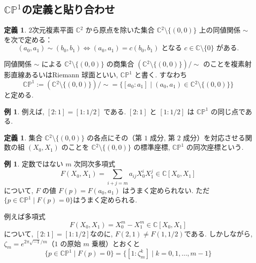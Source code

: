 \documentclass[dvipdfmx,a4paper,11pt]{article} %
\newcommand{\C}{\mathbb{C}}
\theoremstyle{definition}
\numberwithin{equation}{section}
\newtheorem{dfn}[thm]{定義}
\newtheorem{exa}[thm]{例}
\begin{document}
\subsection{$\C\mathbb P^1$の定義と貼り合わせ}\label{O-S002}


\begin{dfn}\label{O-M001}
$2$次元複素平面 $\C{}^2$ から原点を除いた集合 $\C{}^2\setminus \{(0,0)\}$ 上の同値関係 $\sim$ を次で定める：
\[
(a_0,a_1)\sim (b_0,b_1)
\Longleftrightarrow
(a_0,a_1)=c(b_0,b_1)\text{ となる }c\in \C{}\setminus \{0\}\text{ がある}.
\]

同値関係 $\sim$ による $\C{}^2\setminus \{(0,0)\}$ の商集合 $(\C{}^2\setminus \{(0,0)\})/\sim$ のことを複素射影直線あるいはRiemann 球面といい, $\C\mathbb P^1$ と書く. すなわち
\[
\C\mathbb P^1:=(\C{}^2\setminus \{(0,0)\})/\sim
=
\{[a_0:a_1]\mid (a_0,a_1)\in \C{}^2\setminus \{(0,0)\}\}
\]
と定める.
\end{dfn}

\begin{exa}
例えば, $[2:1]=[1:1/2]$ である. 
$[2:1]$ と $[1:1/2]$ は $\C\mathbb P^1$ の同じ点である.
\end{exa}

\begin{dfn}\label{O-M002}
集合 $\C{}^2\setminus \{(0,0)\}$ の各点にその（第 $1$ 成分, 第 $2$ 成分）を対応させる関数の組 $(X_0,X_1)$ のことを $\C{}^2\setminus \{(0,0)\}$ の標準座標, $\C\mathbb P^1$ の同次座標という.
\end{dfn}


\begin{exa}\label{O-M003}
定数ではない $m$ 次同次多項式
\[
F(X_0,X_1)=\sum_{i+j=m}a_{ij}X_0^iX_1^j\in \C{}[X_0,X_1]
\]
について, $F$ の値 $F(p)=F(a_0,a_1)$ はうまく定められない. 
ただ$\{ p \in \C\mathbb P^1 \mid F(p)=0\}$はうまく定められる. 

例えば多項式
\[
F(X_0,X_1)=X_0^m-X_1^m\in \C{}[X_0,X_1]
\]
について, $[2:1]=[1:1/2]$なのに, $F(2, 1) \neq F(1, 1/2) $である. 
しかしながら, $\zeta_m=e^{2\pi\sqrt{-1}/m}$（$1$ の原始 $m$ 乗根）とおくと
$$
\{ p \in \C\mathbb P^1 \mid F(p)=0\}
= \{[1 :\zeta_m^{k}] \mid k=0,1,\ldots, m-1 \}
$$
\end{exa}

\end{document}
